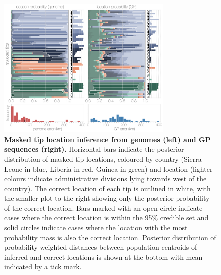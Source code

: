 \documentclass[11pt,oneside,letterpaper]{article}
\begin{document}
\begin{figure}[h]
 \centering
	\includegraphics[width=0.75\textwidth]{figures/fig3_locations.png}
	\caption{\textbf{Masked tip location inference from genomes (left) and GP sequences (right).}
  Horizontal bars indicate the posterior distribution of masked tip locations, coloured by country (Sierra Leone in blue, Liberia in red, Guinea in green) and location (lighter colours indicate administrative divisions lying towards west of the country).
  The correct location of each tip is outlined in white, with the smaller plot to the right showing only the posterior probability of the correct location.
  Bars marked with an open circle indicate cases where the correct location is within the 95\% credible set and solid circles indicate cases where the location with the most probability mass is also the correct location.
  Posterior distribution of probability-weighted distances between population centroids of inferred and correct locations is shown at the bottom with mean indicated by a tick mark.
	}
	\label{locations}
\end{figure}
\end{document}

